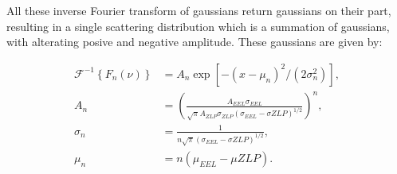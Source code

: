 All these inverse Fourier transform of gaussians return gaussians on their part, resulting in a single scattering distribution which is a summation of gaussians, with alterating posive and negative amplitude. These gaussians are given by:

\begin{equation}
\begin{aligned}
\mathcal{F}^{-1}\left\{ F_n(\nu) \right\} &= A_n \exp{[-(x-\mu_n)^2/(2\sigma_n^2)]}, \\
A_n &= \left( \frac{ A_{EEL} \sigma_{EEL} }{\sqrt{\pi}A_{ZLP} \sigma_{ZLP} (\sigma_{EEL} - \sigma{ZLP})^{1/2} }\right)^n, \\
\sigma_n &= \frac{1}{n\sqrt{\pi}(\sigma_{EEL} - \sigma{ZLP})^{1/2}},\\
\mu_n &= n(\mu_{EEL}-\mu{ZLP}).
\end{aligned}
\end{equation}

